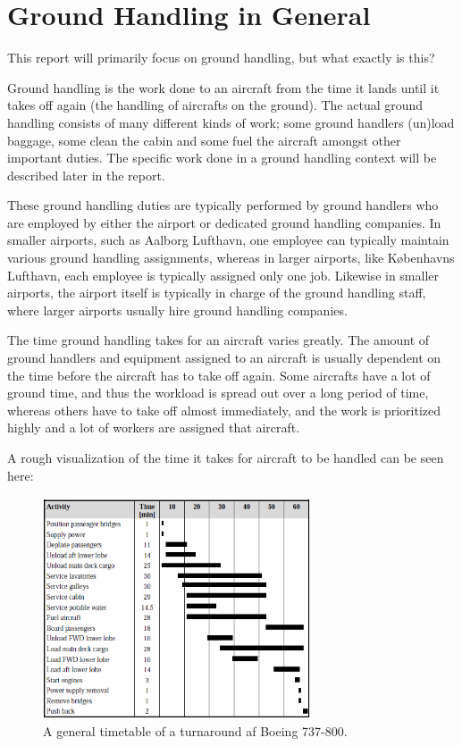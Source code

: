 \section{Ground Handling in General}
This report will primarily focus on ground handling, but what exactly is this?

Ground handling is the work done to an aircraft from the time it lands until it takes off again (the handling of aircrafts on the ground). The actual ground handling consists of many different kinds of work; some ground handlers (un)load baggage, some clean the cabin and some fuel the aircraft amongst other important duties. The specific work done in a ground handling context will be described later in the report.

These ground handling duties are typically performed by ground handlers who are employed by either the airport or dedicated ground handling companies. In smaller airports, such as Aalborg Lufthavn, one employee can typically maintain various ground handling assignments, whereas in larger airports, like Københavns Lufthavn, each employee is typically assigned only one job. Likewise in smaller airports, the airport itself is typically in charge of the ground handling staff, where larger airports usually hire ground handling companies.

The time ground handling takes for an aircraft varies greatly. The amount of ground handlers and equipment assigned to an aircraft is usually dependent on the time before the aircraft has to take off again. Some aircrafts have a lot of ground time, and thus the workload is spread out over a long period of time, whereas others have to take off almost immediately, and the work is prioritized highly and a lot of workers are assigned that aircraft.


A rough visualization of the time it takes for aircraft to be handled can be seen here:
\begin{figure}[H]
\centering
\includegraphics[width=300px]{Grafik/timetable}
\caption{A general timetable of a turnaround af Boeing 737-800.}
\label{timetable}
\end{figure}
